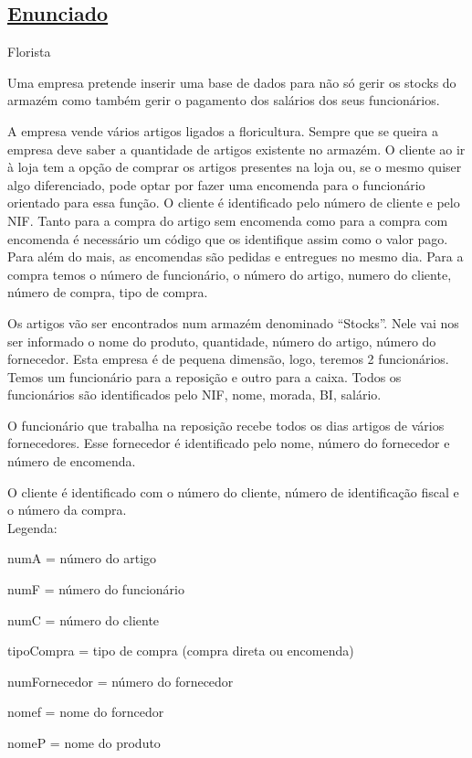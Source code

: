 \documentclass[12pt]{article}
\begin{document}
\begin{titlepage}
\section*{\underline{Enunciado}}
\begin{center}
\begin{LARGE}
Florista
\end{LARGE}
\end{center}
Uma empresa pretende inserir uma base de dados para não só gerir os stocks do armazém como também gerir o pagamento dos salários dos seus funcionários.

A empresa vende vários artigos ligados a floricultura. Sempre que se queira a empresa deve saber a quantidade de artigos existente no armazém. O cliente ao ir à loja tem a opção de comprar os artigos presentes na loja ou,  se o mesmo quiser algo diferenciado, pode optar por fazer uma encomenda para o funcionário orientado para essa função. O cliente é identificado pelo número de cliente e pelo NIF. Tanto para a compra do artigo sem encomenda como para a compra com encomenda é necessário um código que os identifique assim como o valor pago. Para além do mais, as encomendas são pedidas e entregues no mesmo dia.
Para a compra temos o número de funcionário, o número do artigo, numero do cliente, número de compra, tipo de compra.

Os artigos vão ser encontrados num armazém denominado “Stocks”. Nele vai nos ser informado o nome do produto, quantidade, número do artigo, número do fornecedor. Esta empresa é de pequena dimensão, logo, teremos 2 funcionários. Temos um funcionário para a reposição e outro para a caixa. Todos os funcionários são identificados pelo NIF, nome, morada, BI, salário.

O funcionário que trabalha na reposição recebe todos os dias artigos de vários fornecedores. Esse fornecedor é identificado pelo nome, número do fornecedor e número de encomenda.

O cliente é identificado com o número do cliente, número de identificação fiscal e o número da compra.\\
Legenda:

numA = número do artigo

numF = número do funcionário

numC = número do cliente

tipoCompra = tipo de compra (compra direta ou encomenda)

numFornecedor = número do fornecedor

nomef = nome do forncedor

nomeP = nome do produto
\end{titlepage}
\end{document}
